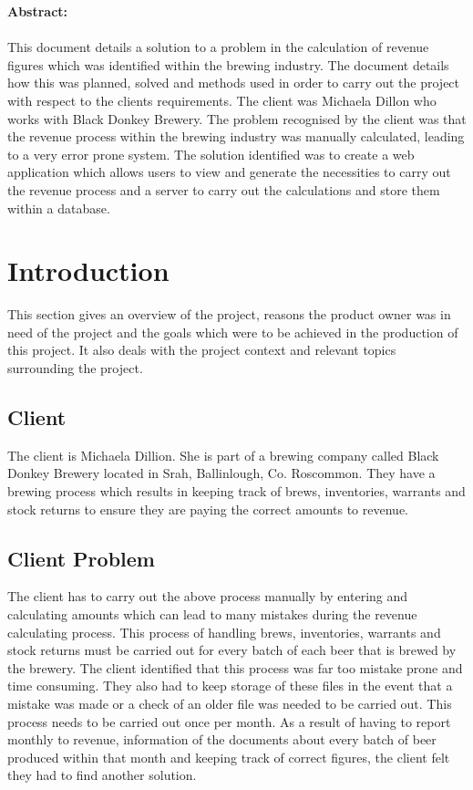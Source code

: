 {\noindent\Large\textbf {Abstract:}} \\  \\ This document details a solution to a problem in the calculation of revenue figures which was identified within the brewing industry. The document details how this was planned, solved and methods used in order to carry out the project with respect to the clients requirements. The client was Michaela Dillon who works with Black Donkey Brewery. The problem recognised by the client was that the revenue process within the brewing industry was manually calculated, leading to a very error prone system. The solution identified was to create a web application which allows users to view and generate the necessities to carry out the revenue process and a server to carry out the calculations and store them within a database.
\chapter{Introduction}
This section gives an overview of the project, reasons the product owner was in need of the project and the goals which were to be achieved in the production of this project. It also deals with the project context and relevant topics surrounding the project.

\section{Client}
The client is Michaela Dillion. She is part of a brewing company called Black Donkey Brewery located in Srah, Ballinlough, Co. Roscommon. They have a brewing process which results in keeping track of brews, inventories, warrants and stock returns to ensure they are paying the correct amounts to revenue. 

\section{Client Problem}
The client has to carry out the above process manually by entering and calculating amounts which can lead to many mistakes during the revenue calculating process. This process of handling brews, inventories, warrants and stock returns must be carried out for every batch of each beer that is brewed by the brewery. The client identified that this process was far too mistake prone and time consuming. They also had to keep storage of these files in the event that a mistake was made or a check of an older file was needed to be carried out. This process needs to be carried out once per month. As a result of having to report monthly to revenue, information of the documents about every batch of beer produced within that month and keeping track of correct figures, the client felt they had to find another solution.

